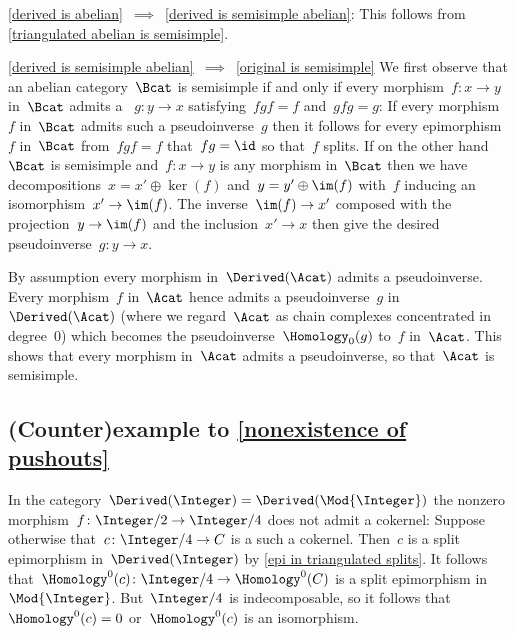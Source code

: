 \documentclass[a4paper,10pt]{scrartcl}
\begin{document}
\begin{implicationslist}
\item[\ref{derived is abelian}~$\implies$~\ref{derived is semisimple abelian}:]
  This follows from \cref{triangulated abelian is semisimple}.

\item[\ref{derived is semisimple abelian}~$\implies$~\ref{original is semisimple}]
  We first observe that an abelian category~$\Bcat$ is semisimple if and only if every morphism~$f \colon x \to y$ in~$\Bcat$ admits a ~$g \colon y \to x$ satisfying~$fgf = f$ and~$gfg = g$:
  If every morphism~$f$ in~$\Bcat$ admits such a pseudoinverse~$g$ then it follows for every epimorphism~$f$ in~$\Bcat$ from~$fgf = f$ that~$fg = \id$ so that~$f$ splits. 
  If on the other hand~$\Bcat$ is semisimple and~$f \colon x \to y$ is any morphism in~$\Bcat$ then we have decompositions~$x = x' \oplus \ker(f)$ and~$y = y' \oplus \im(f)$ with~$f$ inducing an isomorphism~$x' \to \im(f)$.
  The inverse~$\im(f) \to x'$ composed with the projection~$y \to \im(f)$ and the inclusion~$x' \to x$ then give the desired pseudoinverse~$g \colon y \to x$.
  
  By assumption every morphism in~$\Derived(\Acat)$ admits a pseudoinverse.
  Every morphism~$f$ in~$\Acat$ hence admits a pseudoinverse~$g$ in~$\Derived(\Acat)$ (where we regard~$\Acat$ as chain complexes concentrated in degree~$0$) which becomes the pseudoinverse~$\Homology_0(g)$ to~$f$ in~$\Acat$.
  This shows that every morphism in~$\Acat$ admits a pseudoinverse, so that~$\Acat$ is semisimple.
\qedhere
\end{implicationslist}



\subsection{(Counter)example to \cref{nonexistence of pushouts}}
\label{nonexistence of pushouts example}

In the category~$\Derived(\Integer) = \Derived(\Mod{\Integer})$ the nonzero morphism~$f \colon \Integer/2 \to \Integer/4$ does not admit a cokernel:
Suppose otherwise that~$c \colon \Integer/4 \to C$ is a such a cokernel.
Then~$c$ is a split epimorphism in~$\Derived(\Integer)$ by \cref{epi in triangulated splits}.
It follows that~$\Homology^0(c) \colon \Integer/4 \to \Homology^0(C)$ is a split epimorphism in~$\Mod{\Integer}$.
But~$\Integer/4$ is indecomposable, so it follows that~$\Homology^0(c) = 0$ or~$\Homology^0(c)$ is an isomorphism.
\end{document}

